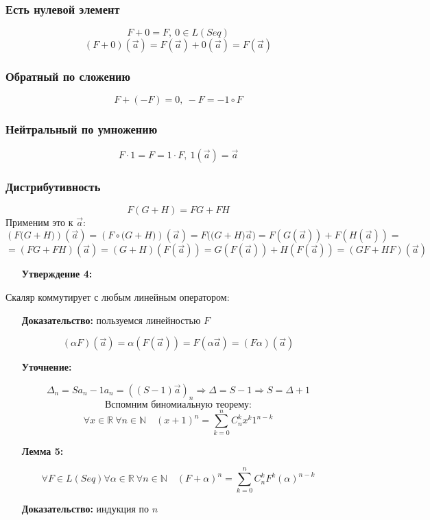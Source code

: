 \documentclass[12pt, letterpaper, twoside]{article}
\newcommand{\AutoBr}[1]{\left(#1\right)}
\begin{document}
\subsubsection*{Есть нулевой элемент}
\[F + 0 = F,\ 0\in L(Seq)\]
\[\AutoBr{F + 0}\AutoBr{\vec{a}} = F(\vec{a}) + 0(\vec{a}) = F(\vec{a})\]
\subsubsection*{Обратный по сложению}
\[F+ (-F) = 0,\ -F = -1\circ F\]
\subsubsection*{Нейтральный по умножению}
\[F\cdot 1 = F = 1\cdot F,\ 1(\vec{a}) = \vec{a}\]
\subsubsection*{Дистрибутивность}
\[F(G + H) = FG + FH\]
Применим это к $\vec{a}$:
\[\AutoBr{F\big(G + H\big)}(\vec{a}) = \AutoBr{F\circ\big(G + H\big)}(\vec{a}) = F\big(\big( G + H \big)\vec{a}\big) = F(G(\vec{a})) + F(H(\vec{a})) =\]
\[= (FG + FH)(\vec{a}) = (G + H)(F(\vec{a})) = G(F(\vec{a})) + H(F(\vec{a})) = (GF + HF)(\vec{a})\]
\[\]
\begin{enumerate}
    \item[\textbf{Утверждение 4:}]
\end{enumerate}
Скаляр коммутирует с любым линейным оператором:
\begin{enumerate}
    \item[\textbf{Доказательство:}] пользуемся линейностью $F$
\end{enumerate}
\[(\alpha F)(\vec{a}) = \alpha(F(\vec{a})) = F(\alpha \vec{a}) = (F\alpha )(\vec{a})\]
\begin{enumerate}
    \item[\textbf{Уточнение:}]
\end{enumerate}
\[\Delta_{n} = Sa_n - 1a_n = ((S - 1)\vec{a})_n\Rightarrow \Delta = S - 1\Rightarrow S = \Delta + 1\]
\[\text{Вспомним биномиальную теорему:}\]
\[\forall x\in \mathbb{R}\ \forall n\in \mathbb{N}\quad (x + 1)^n = \sum_{k = 0}^{n} C_n^k x^k 1^{n - k}\]
\begin{enumerate}
    \item[\textbf{Лемма 5:}]
\end{enumerate}
\[\forall F\in L(Seq)\forall \alpha \in \mathbb{R}\ \forall n\in \mathbb{N}\quad (F + \alpha)^n = \sum_{k = 0}^{n} C_n^k F^k (\alpha)^{n - k}\]
\begin{enumerate}
    \item[\textbf{Доказательство:}] индукция по $n$
\end{enumerate}
\end{document}
